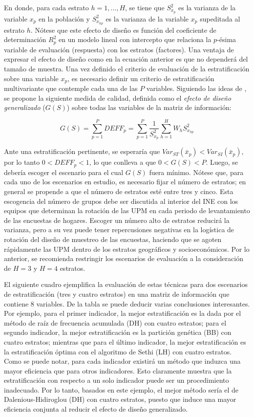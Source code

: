 \documentclass[
  12pt,
]{book}
\begin{document}
En donde, para cada estrato \(h = 1, \ldots, H\), se tiene que \(S^2_{x_p}\) es la varianza de la variable \(x_p\) en la población y \(S^2_{x_{hp}}\) es la varianza de la variable \(x_p\) supeditada al estrato \(h\). Nótese que este efecto de diseño es función del coeficiente de determinación \(R^2_p\) en un modelo lineal con intercepto que relaciona la \(p\)-ésima variable de evaluación (respuesta) con los estratos (factores). Una ventaja de expresar el efecto de diseño como en la ecuación anterior es que no dependerá del tamaño de muestra. Una vez definido el criterio de evaluación de la estratificación sobre una variable \(x_p\), es necesario definir un criterio de estratificación multivariante que contemple cada una de las \(P\) variables. Siguiendo las ideas de \citet{Jarque_1981}, se propone la siguiente medida de calidad, definida como el \emph{efecto de diseño generalizado} (\(G(S)\)) sobre todas las variables de la matriz de información:

\[
G(S) = \sum_{p=1}^P DEFF_p = \sum_{p=1}^P \frac{1}{S^2_{x_p}}\sum_{h=1}^H W_h S^2_{x_{hp}}
\]

Ante una estratificación pertinente, se esperaría que \(Var_{ST}(\bar x _p) < Var_{SI}(\bar x _p)\), por lo tanto \(0 < DEFF_p < 1\), lo que conlleva a que \(0 < G(S) < P\). Luego, se debería escoger el escenario para el cual \(G(S)\) fuera mínimo. Nótese que, para cada uno de los escenarios en estudio, es necesario fijar el número de estratos; en general se propende a que el número de estratos esté entre tres y cinco. Esta escogencia del número de grupos debe ser discutida al interior del INE con los equipos que determinan la rotación de las UPM en cada periodo de levantamiento de las encuestas de hogares. Escoger un número alto de estratos reducirá la varianza, pero a su vez puede tener repercusiones negativas en la logística de rotación del diseño de muestreo de las encuestas, haciendo que se agoten rápidamente las UPM dentro de los estratos geográficos y socioeconómicos. Por lo anterior, se recomienda restringir los escenarios de evaluación a la consideración de \(H=3\) y \(H=4\) estratos.

El siguiente cuadro ejemplifica la evaluación de estas técnicas para dos escenarios de estratificación (tres y cuatro estratos) en una matriz de información que contiene 8 variables. De la tabla se puede deducir varias conclusiones interesantes. Por ejemplo, para el primer indicador, la mejor estratificación es la dada por el método de raíz de frecuencia acumulada (DH) con cuatro estratos; para el segundo indicador, la mejor estratificación es la partición genética (BB) con cuatro estratos; mientras que para el último indicador, la mejor estratificación es la estratificación óptima con el algoritmo de Sethi (LH) con cuatro estratos. Como se puede notar, para cada indicador existirá un método que induzca una mayor eficiencia que para otros indicadores. Esto claramente muestra que la estratificación con respecto a un solo indicador puede ser un procedimiento inadecuado. Por lo tanto, basados en este ejemplo, el mejor método sería el de Dalenious-Hidiroglou (DH) con cuatro estratos, puesto que induce una mayor eficiencia conjunta al reducir el efecto de diseño generalizado.
\end{document}

